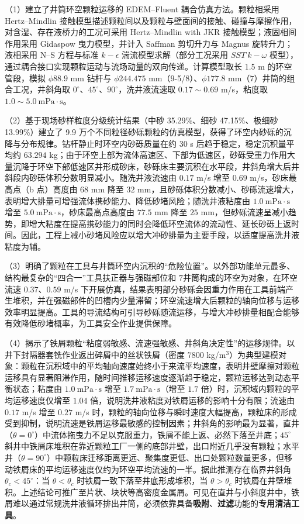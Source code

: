 （1）建立了井筒环空颗粒运移的 EDEM--Fluent 耦合仿真方法。颗粒相采用 Hertz--Mindlin 接触模型描述颗粒间以及颗粒与壁面间的接触、碰撞与摩擦作用，对含湿、存在液桥力的工况可采用 Hertz--Mindlin with JKR 接触模型；液固相间作用采用 Gidaspow 曳力模型，并计入 Saffman 剪切升力与 Magnus 旋转升力；液相采用 N--S 方程与标准 $k-\epsilon$ 湍流模型求解（部分工况采用 $SST\ k-\omega$ 模型），通过耦合接口实现颗粒运动与流场动量的双向传递。计算模型取长 $1.5$ m 的环空管段，模拟 $\phi 88.9$ mm 钻杆与 $\phi 244.475$ mm（$9$-5/8\inch）、$\phi 177.8$ mm（$7$\inch）井筒的组合工况，井斜角取 $0^\circ$、$45^\circ$、$90^\circ$，洗井液流速取 $0.17\sim0.69$ m/s，粘度取 $1.0\sim5.0\ \mathrm{mPa}\cdot\mathrm{s}$。

（2）基于现场砂样粒度分级统计结果（中砂 35.29\%、细砂 47.15\%、极细砂 13.99\%）建立了 9.9 万个不同粒径砂砾颗粒的仿真模型，获得了环空内砂砾的沉降与分布规律。钻杆静止时环空内砂砾质量在约 30 s 后趋于稳定，稳定沉积量平均约 $63.294$ kg；由于环空上部为流体高速区、下部为低速区，砂砾受重力作用大量沉降于环空下部低速区并形成砂床，砂砾床主要沉积在水平段，井斜角增大后井斜段内砂砾体积分数明显减小。随洗井液流速由 $0.17$ m/s 增至 $0.69$ m/s，砂床最高点（b 点）高度由 $68$ mm 降至 $32$ mm，且砂砾体积分数减小、砂砾流速增大，表明增大排量可增强流体携砂能力、降低砂堵风险；随洗井液粘度由 $1.0\ \mathrm{mPa}\cdot\mathrm{s}$ 增至 $5.0\ \mathrm{mPa}\cdot\mathrm{s}$，砂床最高点高度由 $77.5$ mm 降至 $25$ mm，但砂砾流速呈减小趋势，即增大粘度在提高携砂能力的同时会降低环空流体的流动性、延长砂砾上返时间。因此，工程上减小砂堵风险应以增大冲砂排量为主要手段，以适度提高洗井液粘度为辅。

（3）明确了颗粒在工具与井筒环空内沉积的“危险位置”。以外部功能单元最多、结构最复杂的“四合一”工具扶正器与强磁部位和 $7$\inch 井筒构成的环空为对象，在环空流速 $0.37$、$0.59$ m/s 下开展仿真，结果表明部分砂砾会因重力作用在工具前端产生堆积，并在强磁部件的凹槽内少量滞留；环空流速增大后颗粒的轴向位移与运移效率明显提高。工具的导流结构可引导砂砾随流运移，与增大冲砂排量相配合能够有效降低砂堵概率，为工具安全作业提供保障。

（4）揭示了铁屑颗粒“粘度弱敏感、流速强敏感、井斜角决定性”的运移规律。以井下封隔器套铣作业返出碎屑中的丝状铁屑（密度 $7800$ kg/m$^{3}$）为典型建模对象：颗粒在沉积域中的平均轴向速度始终小于来流平均速度，表明井壁摩擦对颗粒运移具有显著阻滞作用，随时间推移运移速度逐渐趋于稳定，颗粒运移达到动态平衡状态；粘度由 $1.0\ \mathrm{mPa}\cdot\mathrm{s}$ 增至 $1.7\ \mathrm{mPa}\cdot\mathrm{s}$（增至 $1.7$ 倍）时，沉积域内颗粒的平均运移速度仅增至 $1.04$ 倍，说明洗井液粘度对铁屑运移的影响十分有限；流速由 $0.17$ m/s 增至 $0.27$ m/s 时，颗粒的轴向位移与瞬时速度大幅提高，颗粒床的形成受到抑制，说明流速是铁屑运移最敏感的控制因素；井斜角的影响最为显著，直井（$\theta=0^\circ$）中流体拖曳力不足以克服重力，铁屑不能上返、必然下落至井底；$45^\circ$ 斜井中铁屑床堆积在靠近颗粒工厂一侧的底部井壁，出口附近几乎没有颗粒；水平井（$\theta=90^\circ$）中颗粒床迁移距离更远、聚集度更低、出口处颗粒数量更多，但移动铁屑床的平均运移速度仅约为环空平均流速的一半。据此推测存在临界井斜角 $\theta_c<45^\circ$：当 $\theta<\theta_c$ 时铁屑一致下落至井底形成堆积，当 $\theta>\theta_c$ 时铁屑在井壁堆积。上述结论可推广至片状、块状等高密度金属屑。可见在直井与小斜度井中，铁屑难以通过常规洗井液循环排出井筒，必须依靠具备\textbf{吸附}、\textbf{过滤}功能的\textbf{专用清洁工具}。

